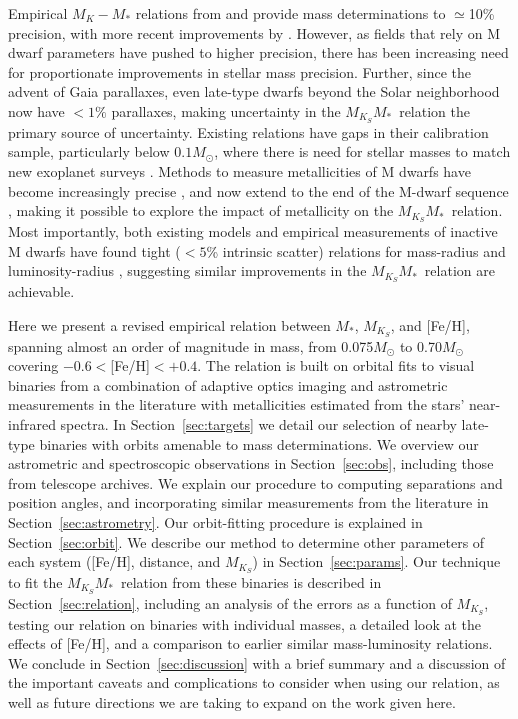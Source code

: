 \documentclass[twocolumn]{aastex62}
\newcommand{\mks}{$M_{K_S}$}
\newcommand{\mmk}{$M_{K_S}$\textendash$M_*$}
\begin{document}
Empirical $M_K-M_*$ relations from \citet{Hen1993} and \citet{Delfosse2000} provide mass determinations to $\simeq$10\% precision, with more recent improvements by \citet{Benedict2016}. However, as fields that rely on M dwarf parameters have pushed to higher precision, there has been increasing need for proportionate improvements in stellar mass precision. Further, since the advent of Gaia parallaxes, even late-type dwarfs beyond the Solar neighborhood now have $<1\%$ parallaxes, making uncertainty in the \mmk\ relation the primary source of uncertainty. Existing relations have gaps in their calibration sample, particularly below $0.1M_\odot$, where there is need for stellar masses to match new exoplanet surveys \citep[e.g.,][]{Gillon2017}. Methods to measure metallicities of M dwarfs have become increasingly precise \citep[e.g.,][]{RojasAyala:2010, 2014A&A...568A.121N}, and now extend to the end of the M-dwarf sequence \citep{Mann2014}, making it possible to explore the impact of metallicity on the \mmk\ relation. Most importantly, both existing models and empirical measurements of inactive M dwarfs have found tight ($<5$\% intrinsic scatter) relations for mass-radius \citep[e.g.,][]{Bayless2006,Spada2013,2017AJ....154..100H} and luminosity-radius \citep[e.g.,][]{Boyajian2012,2015ApJ...802L..10T,Mann2015b}, suggesting similar improvements in the \mmk\ relation are achievable. 

Here we present a revised empirical relation between $M_*$, $M_{K_S}$, and [Fe/H], spanning almost an order of magnitude in mass, from 0.075$M_\odot$ to 0.70$M_\odot$ covering $-0.6<$[Fe/H]$<+0.4$. The relation is built on orbital fits to visual binaries from a combination of adaptive optics imaging and astrometric measurements in the literature with metallicities estimated from the stars' near-infrared spectra. In Section~\ref{sec:targets} we detail our selection of nearby late-type binaries with orbits amenable to mass determinations. We overview our astrometric and spectroscopic observations in Section~\ref{sec:obs}, including those from telescope archives. We explain our procedure to computing separations and position angles, and incorporating similar measurements from the literature in Section~\ref{sec:astrometry}. Our orbit-fitting procedure is explained in Section~\ref{sec:orbit}. We describe our method to determine other parameters of each system ([Fe/H], distance, and \mks) in Section~\ref{sec:params}. Our technique to fit the \mmk\ relation from these binaries is described in Section~\ref{sec:relation}, including an analysis of the errors as a function of \mks, testing our relation on binaries with individual masses, a detailed look at the effects of [Fe/H], and a comparison to earlier similar mass-luminosity relations. We conclude in Section~\ref{sec:discussion} with a brief summary and a discussion of the important caveats and complications to consider when using our relation, as well as future directions we are taking to expand on the work given here.
\end{document}
